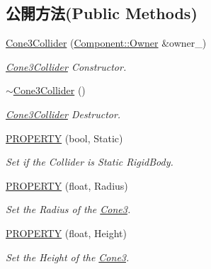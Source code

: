\subsection*{公開方法(Public Methods)}
\begin{DoxyCompactItemize}
\item 
\hyperlink{class_magnum_1_1_cone3_collider_aabfb5ab06a1f03e6835f6cef119b2376}{Cone3\+Collider} (\hyperlink{class_magnum_1_1_component_1_1_owner}{Component\+::\+Owner} \&owner\+\_\+)
\begin{DoxyCompactList}\small\item\em \hyperlink{class_magnum_1_1_cone3_collider}{Cone3\+Collider} Constructor. \end{DoxyCompactList}\item 
\hyperlink{class_magnum_1_1_cone3_collider_a5907a81bd67777d53b2c9c7fb75a7619}{$\sim$\+Cone3\+Collider} ()
\begin{DoxyCompactList}\small\item\em \hyperlink{class_magnum_1_1_cone3_collider}{Cone3\+Collider} Destructor. \end{DoxyCompactList}\item 
\hyperlink{class_magnum_1_1_cone3_collider_a8eefb7ced4f384d0b6ed04ff3ea30140}{P\+R\+O\+P\+E\+R\+TY} (bool, Static)
\begin{DoxyCompactList}\small\item\em Set if the Collider is Static Rigid\+Body. \end{DoxyCompactList}\item 
\hyperlink{class_magnum_1_1_cone3_collider_a210ff836df79b1fabfdcc7f8ebbed552}{P\+R\+O\+P\+E\+R\+TY} (float, Radius)
\begin{DoxyCompactList}\small\item\em Set the Radius of the \hyperlink{class_magnum_1_1_cone3}{Cone3}. \end{DoxyCompactList}\item 
\hyperlink{class_magnum_1_1_cone3_collider_ad0052cc6d0a21cad78a4bc5a6e9f3f41}{P\+R\+O\+P\+E\+R\+TY} (float, Height)
\begin{DoxyCompactList}\small\item\em Set the Height of the \hyperlink{class_magnum_1_1_cone3}{Cone3}. \end{DoxyCompactList}\end{DoxyCompactItemize}

